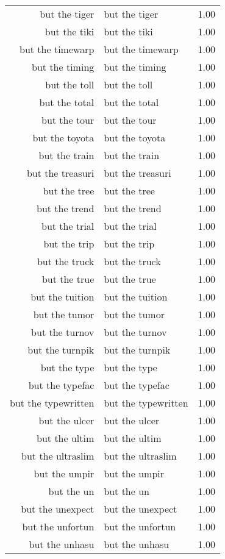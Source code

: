 \begin{table}[ht]
\begin{tabular}{rlr}
  but the tiger & but the tiger & 1.00 \\ 
  but the tiki & but the tiki & 1.00 \\ 
  but the timewarp & but the timewarp & 1.00 \\ 
  but the timing & but the timing & 1.00 \\ 
  but the toll & but the toll & 1.00 \\ 
  but the total & but the total & 1.00 \\ 
  but the tour & but the tour & 1.00 \\ 
  but the toyota & but the toyota & 1.00 \\ 
  but the train & but the train & 1.00 \\ 
  but the treasuri & but the treasuri & 1.00 \\ 
  but the tree & but the tree & 1.00 \\ 
  but the trend & but the trend & 1.00 \\ 
  but the trial & but the trial & 1.00 \\ 
  but the trip & but the trip & 1.00 \\ 
  but the truck & but the truck & 1.00 \\ 
  but the true & but the true & 1.00 \\ 
  but the tuition & but the tuition & 1.00 \\ 
  but the tumor & but the tumor & 1.00 \\ 
  but the turnov & but the turnov & 1.00 \\ 
  but the turnpik & but the turnpik & 1.00 \\ 
  but the type & but the type & 1.00 \\ 
  but the typefac & but the typefac & 1.00 \\ 
  but the typewritten & but the typewritten & 1.00 \\ 
  but the ulcer & but the ulcer & 1.00 \\ 
  but the ultim & but the ultim & 1.00 \\ 
  but the ultraslim & but the ultraslim & 1.00 \\ 
  but the umpir & but the umpir & 1.00 \\ 
  but the un & but the un & 1.00 \\ 
  but the unexpect & but the unexpect & 1.00 \\ 
  but the unfortun & but the unfortun & 1.00 \\ 
  but the unhasu & but the unhasu & 1.00 \\ 

\end{tabular}
\end{table}
